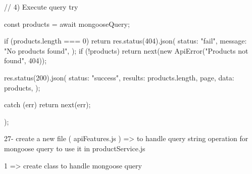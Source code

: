 {    // 4) Execute query
    try {
        const products = await mongooseQuery;

        if (products.length === 0) {
        return res.status(404).json({
            status: "fail",
            message: "No products found",
        });
        }
        if (!products) {
        return next(new ApiError("Products not found", 404));
        }

        res.status(200).json({
        status: "success",
        results: products.length,
        page,
        data: products,
        });
    } catch (err) {
        return next(err);
    }
    });

27- create a new file ( apiFeatures.js ) => to handle query string operation for mongoose query to use it in productService.js 
    
    1 => create class to handle mongoose query 
